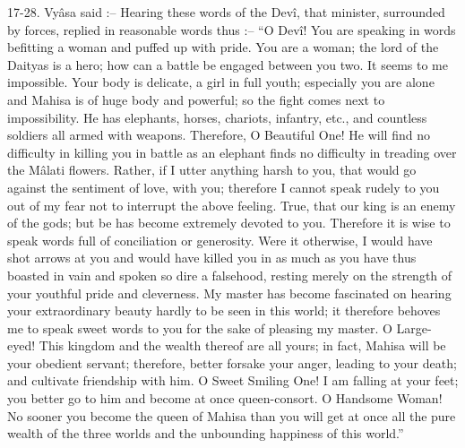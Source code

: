 17-28. Vy\^asa said :-- Hearing these words of the Dev\^i, that minister, surrounded by forces, replied in reasonable words thus :-- ``O Dev\^i! You are speaking in words befitting a woman and puffed up with pride. You are a woman; the lord of the Daityas is a hero; how can a battle be engaged between you two. It seems to me impossible. Your body is delicate, a girl in full youth; especially you are alone and Mahisa is of huge body and powerful; so the fight comes next to impossibility. He has elephants, horses, chariots, infantry, etc., and countless soldiers all armed with weapons. Therefore, O Beautiful One! He will find no difficulty in killing you in battle as an elephant finds no difficulty in treading over the M\^alati flowers. Rather, if I utter anything harsh to you, that would go against the sentiment of love, with you; therefore I cannot speak rudely to you out of my fear not to interrupt the above feeling. True, that our king is an enemy of the gods; but be has become extremely devoted to you. Therefore it is wise to speak words full of conciliation or generosity. Were it otherwise, I would have shot arrows at you and would have killed you in as much as you have thus boasted in vain and spoken so dire a falsehood, resting merely on the strength of your youthful pride and cleverness. My master has become fascinated on hearing your extraordinary beauty hardly to be seen in this world; it therefore behoves me to speak sweet words to you for the sake of pleasing my master. O Large-eyed! This kingdom and the wealth thereof are all yours; in fact, Mahisa will be your obedient servant; therefore, better forsake your anger, leading to your death; and cultivate friendship with him. O Sweet Smiling One! I am falling at your feet; you better go to him and become at once queen-consort. O Handsome Woman! No sooner you become the queen of Mahisa than you will get at once all the pure wealth of the three worlds and the unbounding happiness of this world.''


